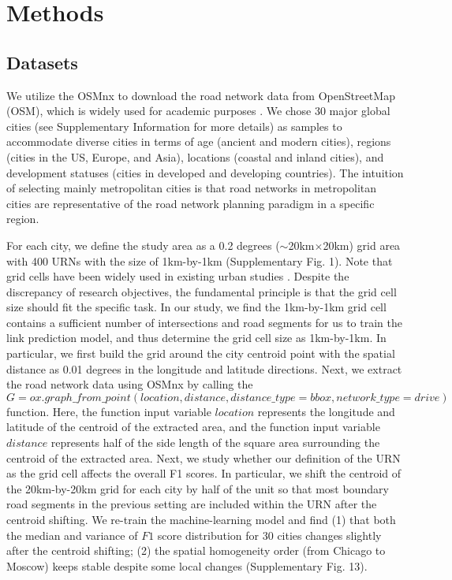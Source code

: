 \documentclass[10pt]{wlscirep}
\begin{document}
\section*{Methods}
\subsection*{Datasets}
We utilize the OSMnx \cite{boeing2017osmnx} to download the road network data from OpenStreetMap (OSM), which is widely used for academic purposes \cite{kirkley2018betweenness,ganin2017resilience,boeing2020multi}. We chose 30 major global cities (see Supplementary Information for more details) as samples to accommodate diverse cities in terms of age (ancient and modern cities), regions (cities in the US, Europe, and Asia), locations (coastal and inland cities), and development statuses (cities in developed and developing countries). The intuition of selecting mainly metropolitan cities is that road networks in metropolitan cities are representative of the road network planning paradigm in a specific region. 

For each city, we define the study area as a 0.2 degrees ($\sim$20km$\times$20km) grid area with 400 URNs with the size of 1km-by-1km (Supplementary Fig. 1). Note that grid cells have been widely used in existing urban studies \cite{louail2014mobile,thompson2020global,abitbol2020interpretable,barrington2020global}. Despite the discrepancy of research objectives, the fundamental principle is that the grid cell size should fit the specific task. In our study, we find the 1km-by-1km grid cell contains a sufficient number of intersections and road segments for us to train the link prediction model, and thus determine the grid cell size as 1km-by-1km. In particular, we first build the grid around the city centroid point with the spatial distance as 0.01 degrees in the longitude and latitude directions. Next, we extract the road network data using OSMnx by calling the $G = ox.graph\_from\_point(location, distance, distance\_type=bbox,  network\_type=drive)$ function. Here, the function input variable $location$ represents the longitude and latitude of the centroid of the extracted area, and the function input variable $distance$ represents half of the side length of the square area surrounding the centroid of the extracted area. Next, we study whether our definition of the URN as the grid cell affects the overall F1 scores. In particular, we shift the centroid of the 20km-by-20km grid for each city by half of the unit so that most boundary road segments in the previous setting are included within the URN after the centroid shifting. We re-train the machine-learning model and find  (1) that both the median and variance of $F1$ score distribution for 30 cities changes slightly after the centroid shifting; (2) the spatial homogeneity order (from Chicago to Moscow) keeps stable despite some local changes (Supplementary Fig. 13).
\end{document}
